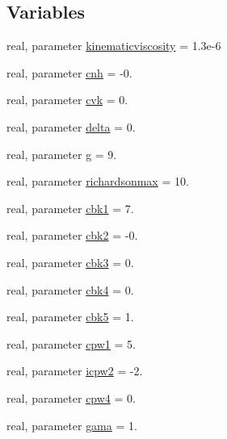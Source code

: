 \subsection*{Variables}
\begin{DoxyCompactItemize}
\item 
real, parameter \mbox{\hyperlink{namespacemoduleturbulence_ad62b0db026f88d0c2b487beade4e08eb}{kinematicviscosity}} = 1.\+3e-\/6
\item 
real, parameter \mbox{\hyperlink{namespacemoduleturbulence_ac4e0b3b2db8e62f3e9d95ec50f14bdf8}{cnh}} = -\/0.
\item 
real, parameter \mbox{\hyperlink{namespacemoduleturbulence_adddd5559eb5d60561f50c8458e67485b}{cvk}} = 0.
\item 
real, parameter \mbox{\hyperlink{namespacemoduleturbulence_ae9d9f2ae68b9865d04266017aa207f35}{delta}} = 0.
\item 
real, parameter \mbox{\hyperlink{namespacemoduleturbulence_a50b658339ff4d17b0ff8d430db7111dc}{g}} = 9.
\item 
real, parameter \mbox{\hyperlink{namespacemoduleturbulence_a9ff8d5e43c5a70b1652f6a7a9b1a4167}{richardsonmax}} = 10.
\item 
real, parameter \mbox{\hyperlink{namespacemoduleturbulence_ada81f70a31cb8c32d07fd796bfe1e5af}{cbk1}} = 7.
\item 
real, parameter \mbox{\hyperlink{namespacemoduleturbulence_ae6bb5f3b916bb34da86c6520bb9a8911}{cbk2}} = -\/0.
\item 
real, parameter \mbox{\hyperlink{namespacemoduleturbulence_a0750fdf99ef02d010fc2f831cbf9a47e}{cbk3}} = 0.
\item 
real, parameter \mbox{\hyperlink{namespacemoduleturbulence_a52421696a2b6905e1b41cb0b06ca3d58}{cbk4}} = 0.
\item 
real, parameter \mbox{\hyperlink{namespacemoduleturbulence_ac8e07e705f846c0aeb2da32508e51a10}{cbk5}} = 1.
\item 
real, parameter \mbox{\hyperlink{namespacemoduleturbulence_a50fd1ae32293b82b44a38e05f942167b}{cpw1}} = 5.
\item 
real, parameter \mbox{\hyperlink{namespacemoduleturbulence_acce43cc93279db98af00c54476c61907}{icpw2}} = -\/2.
\item 
real, parameter \mbox{\hyperlink{namespacemoduleturbulence_ae0ec8e0f40d2dde1eb4818c1b1c64440}{cpw4}} = 0.
\item 
real, parameter \mbox{\hyperlink{namespacemoduleturbulence_a8f01dbc0f39a5dd8da2489f20d7a9533}{gama}} = 1.

\end{DoxyCompactItemize}
